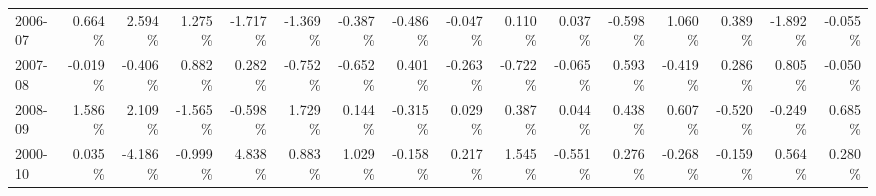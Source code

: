 \begin{sidewaystable}[ht]
{\begin{tabular}{l|rrrrr|rrrrr|rrrrr}
2006-07  &   0.664 \%  &   2.594 \%  &   1.275 \%  &  -1.717 \%  &  -1.369 \%  &  -0.387 \%  &  -0.486 \%  &  -0.047 \%  &   0.110 \%  &   0.037 \%  &  -0.598 \%  &  1.060 \%  &  0.389 \%  &  -1.892 \%  &  -0.055 \% \\
2007-08  &  -0.019 \%  &  -0.406 \%  &   0.882 \%  &   0.282 \%  &  -0.752 \%  &  -0.652 \%  &   0.401 \%  &  -0.263 \%  &  -0.722 \%  &  -0.065 \%  &  0.593 \%  &  -0.419 \%  &  0.286 \%  &  0.805 \%  &  -0.050 \% \\
2008-09  &   1.586 \%  &   2.109 \%  &  -1.565 \%  &  -0.598 \%  &   1.729 \%  &   0.144 \%  &  -0.315 \%  &   0.029 \%  &   0.387 \%  &   0.044 \%  &  0.438 \%  &  0.607 \%  &  -0.520 \%  &  -0.249 \%  &  0.685 \% \\
\midrule
2000-10  &  0.035 \%  &  -4.186 \%  &  -0.999 \%  &  4.838 \%  &  0.883 \%  &  1.029 \%  &  -0.158 \%  &  0.217 \%  &  1.545 \%  &  -0.551 \%  &  0.276 \%  &  -0.268 \%  &  -0.159 \%  &  0.564 \%  &  0.280 \% \\
\bottomrule  
  \end{tabular}
  }  
 \end{sidewaystable}